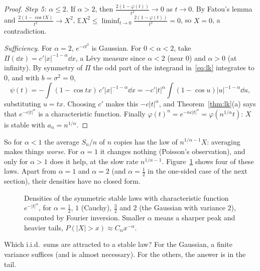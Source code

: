 \begin{proof}
\emph{Step 5: $\alpha\le2$.} If $\alpha>2$, then $\frac{2(1-\varphi(t))}{t^2}\to0$ as $t\to0$. By Fatou's lemma and $\frac{2(1-\cos tX)}{t^2}\to X^2$,
$\mathbb EX^2\le\liminf_{t\to0}\frac{2(1-\varphi(t))}{t^2}=0$, so $X=0$, a contradiction.

\emph{Sufficiency.} For $\alpha=2$, $e^{-ct^2}$ is Gaussian. For $0<\alpha<2$, take $\Pi(\dd x)=c'|x|^{-1-\alpha}\dd x$, a L\'evy measure since $\alpha<2$ (near $0$)
and $\alpha>0$ (at infinity). By symmetry of $\Pi$ the odd part of the integrand in~\eqref{eq:lk} integrates to $0$, and with $b=\sigma^2=0$,
\[
\psi(t)=-\int(1-\cos tx)\,c'|x|^{-1-\alpha}\dd x=-c'|t|^\alpha\int(1-\cos u)|u|^{-1-\alpha}\dd u,
\]
substituting $u=tx$. Choosing $c'$ makes this $-c|t|^\alpha$, and Theorem~\ref{thm:lk}(a) says that $e^{-c|t|^\alpha}$ is a characteristic function. Finally
$\varphi(t)^n=e^{-nc|t|^\alpha}=\varphi(n^{1/\alpha}t)$: $X$ is stable with $a_n=n^{1/\alpha}$.
\end{proof}

So for $\alpha<1$ the average $S_n/n$ of $n$ copies has the law of $n^{1/\alpha-1}X$: averaging makes things \emph{worse}. For $\alpha=1$ it changes
nothing (Poisson's observation), and only for $\alpha>1$ does it help, at the slow rate $n^{1/\alpha-1}$. Figure~\ref{fig:stable} shows four of these laws. Apart
from $\alpha=1$ and $\alpha=2$ (and $\alpha=\frac12$ in the one-sided case of the next section), their densities have no closed form.

\begin{figure}[ht]
\centering{}
\caption{Densities of the symmetric stable laws with characteristic function $e^{-|t|^\alpha}$, for $\alpha=\frac12$, $1$ (Cauchy), $\frac32$ and $2$ (the
Gaussian with variance $2$), computed by Fourier inversion. Smaller $\alpha$ means a sharper peak and heavier tails, $P(|X|>x)\approx C_\alpha x^{-\alpha}$.}
\label{fig:stable}
\end{figure}

Which i.i.d.\ sums are attracted to a stable law? For the Gaussian, a finite variance suffices (and is almost necessary). For the others, the answer is
in the tail.

